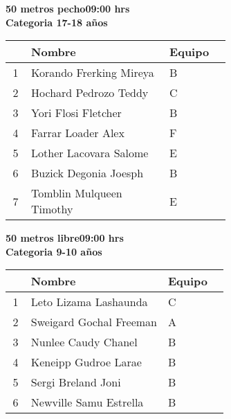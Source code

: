 \begin{minipage}{0.95\linewidth}\vspace{0.5cm} 
\begin{flushleft}
\textbf{
\hspace{-0.15cm}50 metros pecho\hspace{1.5cm}09:00 hrs \\Categoria 17-18 años}\vspace{-0.2cm} 
\end{flushleft}
\begin{tabular}{cp{0.63\linewidth}l}
\hline
& \textbf{Nombre} & \textbf{Equipo} \\ \hline
1 & Korando Frerking Mireya & B \\ 
2 & Hochard Pedrozo Teddy & C \\ 
3 & Yori Flosi Fletcher & B \\ 
4 & Farrar Loader Alex & F \\ 
5 & Lother Lacovara Salome & E \\ 
6 & Buzick Degonia Joesph & B \\ 
7 & Tomblin Mulqueen Timothy & E \\ 
\end{tabular}
\end{minipage}
\begin{minipage}{0.95\linewidth}\vspace{0.5cm} 
\begin{flushleft}
\textbf{
\hspace{-0.15cm}50 metros libre\hspace{1.5cm}09:00 hrs \\Categoria 9-10 años}\vspace{-0.2cm} 
\end{flushleft}
\begin{tabular}{cp{0.63\linewidth}l}
\hline
& \textbf{Nombre} & \textbf{Equipo} \\ \hline
1 & Leto Lizama Lashaunda & C \\ 
2 & Sweigard Gochal Freeman & A \\ 
3 & Nunlee Caudy Chanel & B \\ 
4 & Keneipp Gudroe Larae & B \\ 
5 & Sergi Breland Joni & B \\ 
6 & Newville Samu Estrella & B \\ 
\end{tabular}
\end{minipage}
